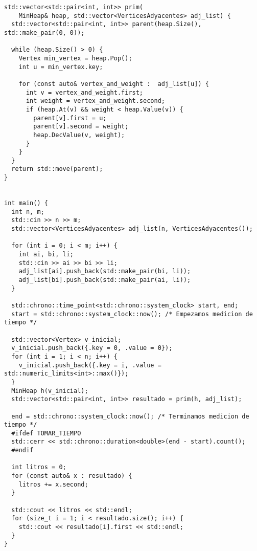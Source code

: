 \begin{lstlisting}[frame=single]
std::vector<std::pair<int, int>> prim(
    MinHeap& heap, std::vector<VerticesAdyacentes> adj_list) {
  std::vector<std::pair<int, int>> parent(heap.Size(), std::make_pair(0, 0));

  while (heap.Size() > 0) {
    Vertex min_vertex = heap.Pop();
    int u = min_vertex.key;

    for (const auto& vertex_and_weight :  adj_list[u]) {
      int v = vertex_and_weight.first;
      int weight = vertex_and_weight.second;
      if (heap.At(v) && weight < heap.Value(v)) {
        parent[v].first = u;
        parent[v].second = weight;
        heap.DecValue(v, weight);
      }
    }
  }
  return std::move(parent);
}


int main() {
  int n, m;
  std::cin >> n >> m;
  std::vector<VerticesAdyacentes> adj_list(n, VerticesAdyacentes());

  for (int i = 0; i < m; i++) {
    int ai, bi, li;
    std::cin >> ai >> bi >> li;
    adj_list[ai].push_back(std::make_pair(bi, li));
    adj_list[bi].push_back(std::make_pair(ai, li));
  }

  std::chrono::time_point<std::chrono::system_clock> start, end;
  start = std::chrono::system_clock::now(); /* Empezamos medicion de tiempo */

  std::vector<Vertex> v_inicial;
  v_inicial.push_back({.key = 0, .value = 0});
  for (int i = 1; i < n; i++) {
    v_inicial.push_back({.key = i, .value = std::numeric_limits<int>::max()});
  }
  MinHeap h(v_inicial);  
  std::vector<std::pair<int, int>> resultado = prim(h, adj_list);

  end = std::chrono::system_clock::now(); /* Terminamos medicion de tiempo */
  #ifdef TOMAR_TIEMPO
  std::cerr << std::chrono::duration<double>(end - start).count();
  #endif

  int litros = 0;
  for (const auto& x : resultado) {
    litros += x.second;
  }

  std::cout << litros << std::endl;
  for (size_t i = 1; i < resultado.size(); i++) {
    std::cout << resultado[i].first << std::endl;
  }
}
\end{lstlisting}


